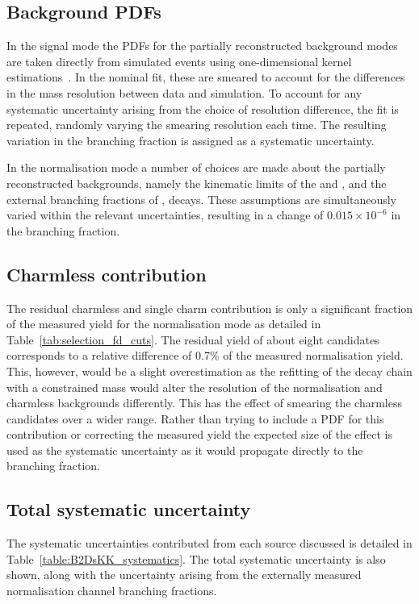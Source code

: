 \subsection{Background PDFs}

In the signal mode the PDFs for the partially reconstructed background modes are taken directly from simulated events using one-dimensional kernel estimations~\cite{Cranmer:2000du}. In the nominal fit, these are smeared to account for the differences in the mass resolution between data and simulation. To account for any systematic uncertainty arising from the choice of resolution difference, the fit is repeated, randomly varying the smearing resolution each time. The resulting variation in the branching fraction is assigned as a systematic uncertainty. 

In the normalisation mode a number of choices are made about the partially reconstructed backgrounds, namely the kinematic limits of the \decay{\Bp}{\Dssp\Dzb} and \decay{\Bp}{\Dsp\Dstarzb}, and the external branching fractions of \decay{\Dssp}{\Dsp[\Pgamma/\piz]},
 \decay{\Dstarzb}{\Dzb[\Pgamma/\piz]} decays. These assumptions are simultaneously varied within the relevant uncertainties, resulting in a change of $0.015\times10^{-6}$ in the branching fraction.



\subsection{Charmless contribution}

The residual charmless and single charm contribution is only a significant fraction of the measured yield for the normalisation mode as detailed in Table~\ref{tab:selection_fd_cuts}. The residual yield of about eight candidates corresponds to a relative difference of 0.7\% of the measured normalisation yield. This, however, would be a slight overestimation as the refitting of the decay chain with a constrained \Dsp mass would alter the resolution of the normalisation and charmless backgrounds differently. This has the effect of smearing the charmless candidates over a wider range. Rather than trying to include a PDF for this contribution or correcting the measured yield the expected size of the effect is used as the systematic uncertainty as it would propagate directly to the branching fraction. 


\subsection{Total systematic uncertainty}
The systematic uncertainties contributed from each source discussed is detailed in Table~\ref{table:B2DsKK_systematics}. The total systematic uncertainty is also shown, along with the uncertainty arising from the externally measured normalisation channel branching fractions. 

